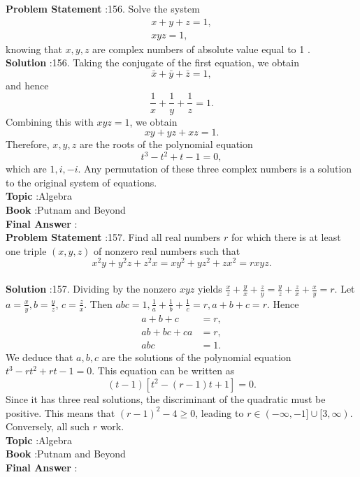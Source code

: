 \documentclass[10pt]{article}
\begin{document}
\textbf{Problem Statement} :156. Solve the system$$ \begin{array}{r} x+y+z=1, \\ x y z=1, \end{array} $$knowing that $x, y, z$ are complex numbers of absolute value equal to 1 .\\
\textbf{Solution} :156. Taking the conjugate of the first equation, we obtain$$ \bar{x}+\bar{y}+\bar{z}=1, $$and hence$$ \frac{1}{x}+\frac{1}{y}+\frac{1}{z}=1 . $$Combining this with $x y z=1$, we obtain$$ x y+y z+x z=1 . $$Therefore, $x, y, z$ are the roots of the polynomial equation$$ t^{3}-t^{2}+t-1=0, $$which are $1, i,-i$. Any permutation of these three complex numbers is a solution to the original system of equations.\\
\textbf{Topic} :Algebra\\
\textbf{Book} :Putnam and Beyond\\
\textbf{Final Answer} :\\


\textbf{Problem Statement} :157. Find all real numbers $r$ for which there is at least one triple $(x, y, z)$ of nonzero real numbers such that$$ x^{2} y+y^{2} z+z^{2} x=x y^{2}+y z^{2}+z x^{2}=r x y z . $$\\
\textbf{Solution} :157. Dividing by the nonzero $x y z$ yields $\frac{x}{z}+\frac{y}{x}+\frac{z}{y}=\frac{y}{z}+\frac{z}{x}+\frac{x}{y}=r$. Let $a=\frac{x}{y}, b=\frac{y}{z}$, $c=\frac{z}{x}$. Then $a b c=1, \frac{1}{a}+\frac{1}{b}+\frac{1}{c}=r, a+b+c=r$. Hence $$ \begin{aligned} a+b+c &=r, \\ a b+b c+c a &=r, \\ a b c &=1 . \end{aligned} $$We deduce that $a, b, c$ are the solutions of the polynomial equation $t^{3}-r t^{2}+r t-1=0$. This equation can be written as$$ (t-1)\left[t^{2}-(r-1) t+1\right]=0 . $$Since it has three real solutions, the discriminant of the quadratic must be positive. This means that $(r-1)^{2}-4 \geq 0$, leading to $r \in(-\infty,-1] \cup[3, \infty)$. Conversely, all such $r$ work.\\
\textbf{Topic} :Algebra\\
\textbf{Book} :Putnam and Beyond\\
\textbf{Final Answer} :\\
\end{document}
